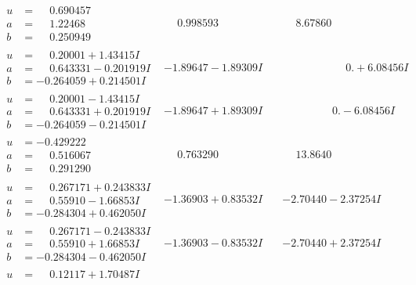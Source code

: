 \documentclass[1p]{elsarticle_modified}
\theoremstyle{definition}
\begin{document}
$$\begin{array}{c|c|c}
\begin{aligned}
u &= \phantom{-}0.690457\phantom{ +0.000000I} \\
a &= \phantom{-}1.22468\phantom{ +0.000000I} \\
b &= \phantom{-}0.250949\phantom{ +0.000000I}\end{aligned}
 & \phantom{-}0.998593\phantom{ +0.000000I} & \phantom{-}8.67860\phantom{ +0.000000I} \\ \hline\begin{aligned}
u &= \phantom{-}0.20001 + 1.43415 I \\
a &= \phantom{-}0.643331 - 0.201919 I \\
b &= -0.264059 + 0.214501 I\end{aligned}
 & -1.89647 - 1.89309 I & \phantom{-0.000000 -}0. + 6.08456 I \\ \hline\begin{aligned}
u &= \phantom{-}0.20001 - 1.43415 I \\
a &= \phantom{-}0.643331 + 0.201919 I \\
b &= -0.264059 - 0.214501 I\end{aligned}
 & -1.89647 + 1.89309 I & \phantom{-0.000000 } 0. - 6.08456 I \\ \hline\begin{aligned}
u &= -0.429222\phantom{ +0.000000I} \\
a &= \phantom{-}0.516067\phantom{ +0.000000I} \\
b &= \phantom{-}0.291290\phantom{ +0.000000I}\end{aligned}
 & \phantom{-}0.763290\phantom{ +0.000000I} & \phantom{-}13.8640\phantom{ +0.000000I} \\ \hline\begin{aligned}
u &= \phantom{-}0.267171 + 0.243833 I \\
a &= \phantom{-}0.55910 - 1.66853 I \\
b &= -0.284304 + 0.462050 I\end{aligned}
 & -1.36903 + 0.83532 I & -2.70440 - 2.37254 I \\ \hline\begin{aligned}
u &= \phantom{-}0.267171 - 0.243833 I \\
a &= \phantom{-}0.55910 + 1.66853 I \\
b &= -0.284304 - 0.462050 I\end{aligned}
 & -1.36903 - 0.83532 I & -2.70440 + 2.37254 I \\ \hline\begin{aligned}
u &= \phantom{-}0.12117 + 1.70487 I \\

\end{aligned}
\end{array}$$
\end{document}
